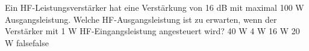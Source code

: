     {Ein HF-Leistungsverstärker hat eine Verstärkung von 16 dB mit maximal 100 W Ausgangsleistung. Welche HF-Ausgangsleistung ist zu erwarten, wenn der Verstärker mit 1 W HF-Eingangsleistung angesteuert wird?}
    {40 W}
    {4 W}
    {16 W}
    {20 W}
    {false}{false}